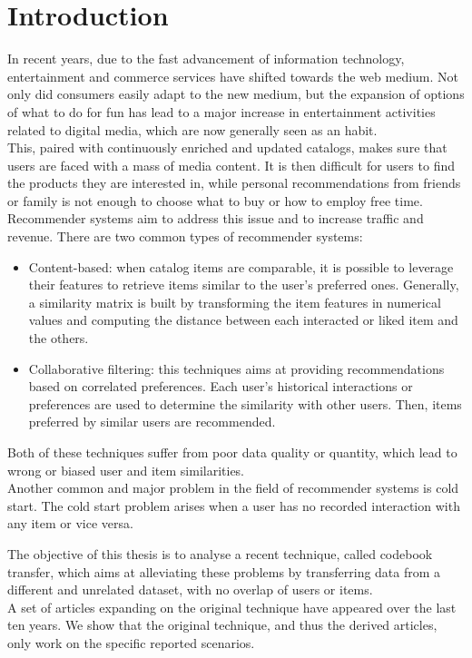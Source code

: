 \chapter{Introduction}

In recent years, due to the fast advancement of information technology, entertainment and commerce services have shifted towards the web medium.
Not only did consumers easily adapt to the new medium, but the expansion of options of what to do for fun has lead to a major increase in entertainment activities related to digital media, which are now generally seen as an habit.\\
This, paired with continuously enriched and updated catalogs, makes sure that users are faced with a mass of media content. It is then difficult for users to find the products they are interested in, while personal recommendations from friends or family is not enough to choose what to buy or how to employ free time. Recommender systems aim to address this issue and to increase traffic and revenue. There are two common types of recommender systems:
\begin{itemize}
\item Content-based: when catalog items are comparable, it is possible to leverage their features to retrieve items similar to the user's preferred ones. Generally, a similarity matrix is built by transforming the item features in numerical values and computing the distance between each interacted or liked item and the others.
\item Collaborative filtering: this techniques aims at providing recommendations based on correlated preferences. Each user's historical interactions or preferences are used to determine the similarity with other users. Then, items preferred by similar users are recommended.
\end{itemize}
Both of these techniques suffer from poor data quality or quantity, which lead to wrong or biased user and item similarities.\\
Another common and major problem in the field of recommender systems is cold start.
The cold start problem arises when a user has no recorded interaction with any item or vice versa.\par
The objective of this thesis is to analyse a recent technique, called codebook transfer, which aims at alleviating these problems by transferring data from a different and unrelated dataset, with no overlap of users or items.\\
A set of articles expanding on the original technique have appeared over the last ten years.
We show that the original technique, and thus the derived articles, only work on the specific reported scenarios.

